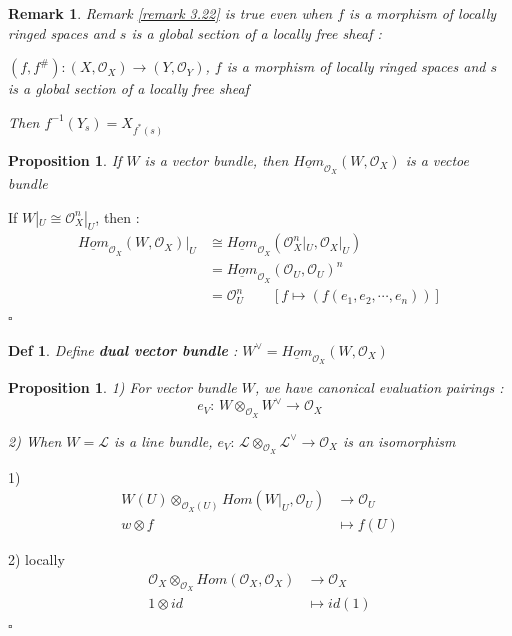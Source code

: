 \documentclass{article}
\newtheorem{definition}[theorem]{Def}
\newtheorem{proposition}[theorem]{Proposition}
\newtheorem{remark}[theorem]{Remark}
\newenvironment{Proof}{{\noindent \indent \it Proof:\quad}}{\hfill $\square$\par}
\begin{document}
\begin{remark}
    Remark \ref{remark 3.22} is true even when $f$ is a morphism of locally ringed spaces and $s$ is a global section of a locally free sheaf :

$(f,f^{\#}):(X,\mathcal O_X)\to(Y,\mathcal O_Y)$, $f$ is a morphism of locally ringed spaces and $s$ is a global section of a locally free sheaf

Then
$f^{-1}(Y_s)= 
X_{f^{\ast}(s)}$
\end{remark}

\begin{proposition}
    If $W$ is a vector bundle, then $\underline{Hom}_{\mathcal O_X}(W,\mathcal O_X)$ is a vectoe bundle
\end{proposition}
\begin{Proof}
    If $W|_U\cong \mathcal O_X^n|_U$, then :
\begin{align*}
\label{sup}
\underline{Hom}_{\mathcal O_X}(W,\mathcal O_X)|_U
&\cong \underline{Hom}_{\mathcal O_X}(\mathcal O_X^n|_U,\mathcal O_X|_U)\\
&=\underline{Hom}_{\mathcal O_X}(\mathcal O_U,\mathcal O_U)^n\\
&=\mathcal O_U^n\quad\quad
[f\mapsto (f(e_1,e_2,\cdots,e_n))]
 \end{align*}
\end{Proof}

\begin{definition}
    Define \textbf{dual vector bundle} : $W^\vee=\underline{Hom}_{\mathcal O_X}(W,\mathcal O_X)$
\end{definition}

\begin{proposition}
    1) For vector bundle $W$, we have canonical evaluation pairings : $$e_V:\,W\otimes_{\mathcal O_X}W^\vee\to\mathcal O_X$$

    2) When $W=\mathcal L$ is a line bundle, $e_V:\,\mathcal L\otimes_{\mathcal O_X}\mathcal L^\vee\to\mathcal O_X$ is an isomorphism
\end{proposition}
\begin{Proof}
    1) 
\begin{align*}
\label{sup}
W(U)\otimes_{\mathcal O_X(U)}Hom(W|_U,\mathcal O_U)&\to\mathcal O_U\\
w\otimes f&\mapsto f(U)
 \end{align*}

2) locally
\begin{align*}
\label{sup}
\mathcal O_X\otimes_{\mathcal O_X}Hom(\mathcal O_X,\mathcal O_X)&\to\mathcal O_X\\
1\otimes id&\mapsto id(1)
 \end{align*}
\end{Proof}
\end{document}
